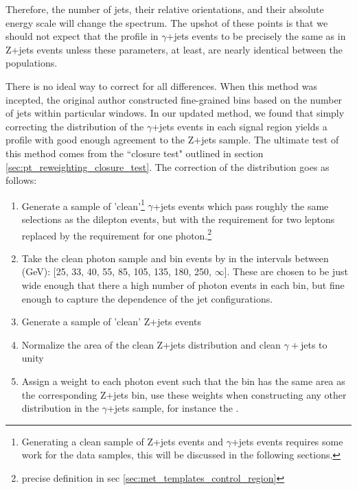     Therefore, the number of jets, their relative orientations, and their absolute energy scale will change the \MET spectrum. The upshot of these points is that we should not expect that the \MET profile in $\gamma$+jets events to be precisely the same as in Z+jets events unless these parameters, at least, are nearly identical between the populations. 

    There is no ideal way to correct for all differences. When this method was incepted\cite{MET_templates}, the original author constructed fine-grained bins based on the number of jets within particular \pt windows. In our updated method, we found that simply correcting the \pt distribution of the $\gamma$+jets events in each signal region yields a \MET profile with good enough agreement to the Z+jets sample. The ultimate test of this method comes from the ``closure test" outlined in section \ref{sec:pt_reweighting_closure_test}. The correction of the \pt distribution goes as follows:

    \begin{enumerate}
      \item Generate a sample of 'clean'\footnote{Generating a clean sample of Z+jets events and $\gamma$+jets events requires some work for the data samples, this will be discussed in the following sections.} $\gamma$+jets events which pass roughly the same selections as the dilepton events, but with the requirement for two leptons replaced by the requirement for one photon.\footnote{precise definition in sec \ref{sec:met_templates_control_region}} 

      \item Take the clean photon sample and bin events by \pt in the intervals between (GeV): [25, 33, 40, 55, 85, 105, 135, 180, 250, $\infty$]. These are chosen to be just wide enough that there a high number of photon events in each bin, but fine enough to capture the \pt dependence of the jet configurations. 

      \item Generate a sample of 'clean' Z+jets events

      \item Normalize the area of the clean Z+jets \pt distribution and clean $\gamma+$jets to unity

      \item Assign a weight to each photon event such that the bin has the same area as the corresponding Z+jets \pt bin, use these weights when constructing any other distribution in the $\gamma$+jets sample, for instance the \MET.
    \end{enumerate}

